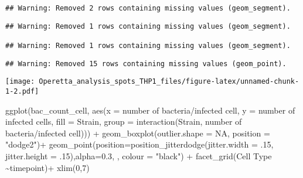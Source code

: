 \documentclass[
]{article}
\newenvironment{Shaded}{\begin{snugshade}}{\end{snugshade}}
\newcommand{\AttributeTok}[1]{\textcolor[rgb]{0.77,0.63,0.00}{#1}}
\newcommand{\ConstantTok}[1]{\textcolor[rgb]{0.00,0.00,0.00}{#1}}
\newcommand{\DecValTok}[1]{\textcolor[rgb]{0.00,0.00,0.81}{#1}}
\newcommand{\FloatTok}[1]{\textcolor[rgb]{0.00,0.00,0.81}{#1}}
\newcommand{\FunctionTok}[1]{\textcolor[rgb]{0.00,0.00,0.00}{#1}}
\newcommand{\NormalTok}[1]{#1}
\newcommand{\SpecialCharTok}[1]{\textcolor[rgb]{0.00,0.00,0.00}{#1}}
\newcommand{\StringTok}[1]{\textcolor[rgb]{0.31,0.60,0.02}{#1}}
\begin{document}
\begin{verbatim}
## Warning: Removed 2 rows containing missing values (geom_segment).
\end{verbatim}

\begin{verbatim}
## Warning: Removed 1 rows containing missing values (geom_segment).

## Warning: Removed 1 rows containing missing values (geom_segment).
\end{verbatim}

\begin{verbatim}
## Warning: Removed 15 rows containing missing values (geom_point).
\end{verbatim}

\texttt{[image: Operetta\_analysis\_spots\_THP1\_files/figure-latex/unnamed-chunk-1-2.pdf]}

\begin{Shaded}
\begin{Highlighting}[]
\FunctionTok{ggplot}\NormalTok{(bac\_count\_cell, }\FunctionTok{aes}\NormalTok{(}\AttributeTok{x =} \StringTok{\textasciigrave{}}\AttributeTok{number of bacteria/infected cell}\StringTok{\textasciigrave{}}\NormalTok{, }\AttributeTok{y =} \StringTok{\textasciigrave{}}\AttributeTok{number of infected cells}\StringTok{\textasciigrave{}}\NormalTok{, }\AttributeTok{fill =} \StringTok{\textasciigrave{}}\AttributeTok{Strain}\StringTok{\textasciigrave{}}\NormalTok{,}
                           \AttributeTok{group =}  \FunctionTok{interaction}\NormalTok{(}\StringTok{\textasciigrave{}}\AttributeTok{Strain}\StringTok{\textasciigrave{}}\NormalTok{, }\StringTok{\textasciigrave{}}\AttributeTok{number of bacteria/infected cell}\StringTok{\textasciigrave{}}\NormalTok{))) }\SpecialCharTok{+}
  \FunctionTok{geom\_boxplot}\NormalTok{(}\AttributeTok{outlier.shape =} \ConstantTok{NA}\NormalTok{, }\AttributeTok{position =} \StringTok{"dodge2"}\NormalTok{)}\SpecialCharTok{+}
  \FunctionTok{geom\_point}\NormalTok{(}\AttributeTok{position=}\FunctionTok{position\_jitterdodge}\NormalTok{(}\AttributeTok{jitter.width =}\NormalTok{ .}\DecValTok{15}\NormalTok{, }\AttributeTok{jitter.height =}\NormalTok{ .}\DecValTok{15}\NormalTok{),}\AttributeTok{alpha=}\FloatTok{0.3}\NormalTok{, , }\AttributeTok{colour =} \StringTok{"black"}\NormalTok{) }\SpecialCharTok{+}
  \FunctionTok{facet\_grid}\NormalTok{(}\StringTok{\textasciigrave{}}\AttributeTok{Cell Type}\StringTok{\textasciigrave{}} \SpecialCharTok{\textasciitilde{}}\NormalTok{timepoint)}\SpecialCharTok{+}
  \FunctionTok{xlim}\NormalTok{(}\DecValTok{0}\NormalTok{,}\DecValTok{7}\NormalTok{)}
\end{Highlighting}
\end{Shaded}
\end{document}
